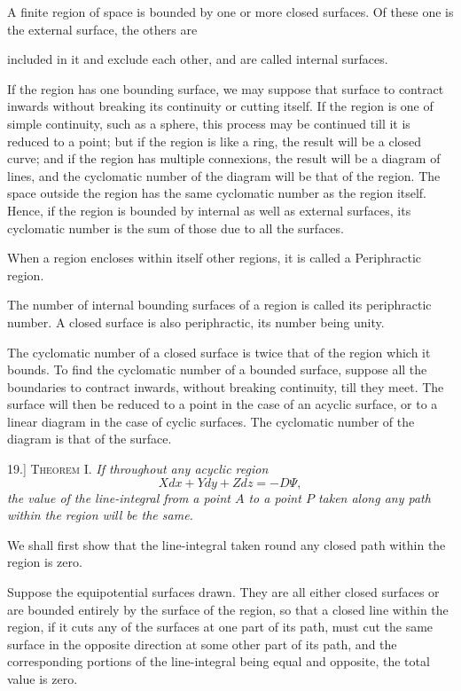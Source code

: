\documentclass[11pt,a4paper]{article}
\begin{document}
A finite region of space is bounded by one or more closed surfaces. Of
these one is the external surface, the others are

\clearpage

included in it and exclude each other, and are called internal surfaces.

If the region has one bounding surface, we may suppose that surface to
contract inwards without breaking its continuity or cutting itself. If
the region is one of simple continuity, such as a sphere, this process
may be continued till it is reduced to a point; but if the region is
like a ring, the result will be a closed curve; and if the region has
multiple connexions, the result will be a diagram of lines, and the
cyclomatic number of the diagram will be that of the region. The space
outside the region has the same cyclomatic number as the region itself.
Hence, if the region is bounded by internal as well as external
surfaces, its cyclomatic number is the sum of those due to all the
surfaces.

When a region encloses within itself other regions, it is called a
Periphractic region.

The number of internal bounding surfaces of a region is called its
periphractic number. A closed surface is also periphractic, its number
being unity.

The cyclomatic number of a closed surface is twice that of the region
which it bounds. To find the cyclomatic number of a bounded surface,
suppose all the boundaries to contract inwards, without breaking
continuity, till they meet. The surface will then be reduced to a point
in the case of an acyclic surface, or to a linear diagram in the case of
cyclic surfaces. The cyclomatic number of the diagram is that of the
surface.

19.] \textsc{Theorem I.} \textit{If throughout any acyclic region}
\[
Xdx+Ydy+Zdz=-D\Psi,
\]
\textit{the value of the line-integral from a point \(A\) to a point
\(P\) taken along any path within the region will be the same.}

We shall first show that the line-integral taken round any closed path
within the region is zero.

Suppose the equipotential surfaces drawn. They are all either closed
surfaces or are bounded entirely by the surface of the region, so that a
closed line within the region, if it cuts any of the surfaces at one
part of its path, must cut the same surface in the opposite direction at
some other part of its path, and the corresponding portions of the
line-integral being equal and opposite, the total value is zero.
\end{document}
